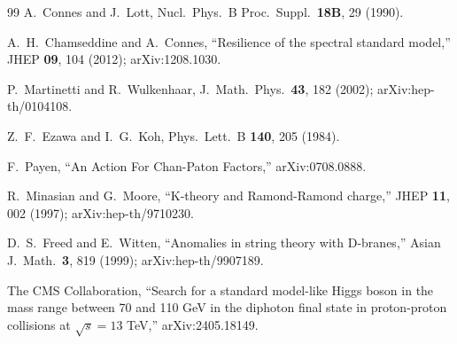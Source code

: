 \documentclass[aps,prl,twocolumn,superscriptaddress,floatfix,nofootinbib,reprint]{revtex4-2}
\begin{document}
\begin{thebibliography}{99}
A.~Connes and J.~Lott, Nucl.\ Phys.\ B Proc.\ Suppl.\ \textbf{18B}, 29
(1990).

A.~H.~Chamseddine and A.~Connes, ``Resilience of the spectral standard
model,'' JHEP \textbf{09}, 104 (2012); arXiv:1208.1030.

P.~Martinetti and R.~Wulkenhaar, J.~Math.~Phys.~\textbf{43}, 182
(2002); arXiv:hep-th/0104108.

Z.~F.~Ezawa and I.~G.~Koh, Phys.\ Lett.\ B \textbf{140}, 205 (1984).

F.~Payen, ``An Action For Chan-Paton Factors,'' arXiv:0708.0888.

R.~Minasian and G.~Moore, ``K-theory and Ramond-Ramond charge,'' JHEP
\textbf{11}, 002 (1997); arXiv:hep-th/9710230.

D.~S.~Freed and E.~Witten, ``Anomalies in string theory with D-branes,''
Asian J.\ Math.\ \textbf{3}, 819 (1999); arXiv:hep-th/9907189.

The CMS Collaboration, ``Search for a standard model-like Higgs boson in
the mass range between 70 and 110 GeV in the diphoton final state in
proton-proton collisions at $\sqrt{s}=13$ TeV,'' arXiv:2405.18149.


\end{thebibliography}
\end{document}
